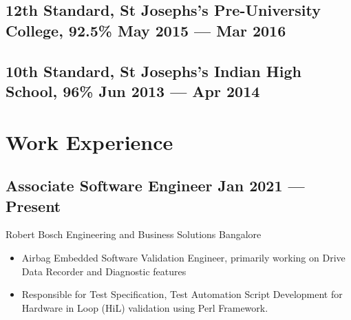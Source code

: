 \documentclass[a4,10pt]{article}
\newcommand{\subtext}[1]{
#1\par\vspace{-0.2cm}}
\newenvironment{zitemize}{
\begin{itemize}\itemsep0pt \parskip0pt \parsep1pt}
{\end{itemize}\vspace{-0.5cm}}
\begin{document}
\subsection*{12th Standard, {\normalsize \normalfont St Josephs's Pre-University College, 92.5\%} \hfill May 2015 --- Mar 2016}
\vspace{0.1cm}
\subsection*{10th Standard, {\normalsize \normalfont St Josephs's Indian High School, 96\%} \hfill Jun 2013 --- Apr 2014} 
\vspace{0.2cm}

\section{Work Experience}

        

\subsection*{Associate Software Engineer \hfill Jan 2021 --- Present} 
\subtext{Robert Bosch Engineering and Business Solutions \hfill Bangalore} 
    \begin{zitemize}
        \item Airbag Embedded Software Validation Engineer, primarily working on Drive Data Recorder and Diagnostic features 
        \item Responsible for Test Specification, Test Automation Script Development for Hardware in Loop (HiL) validation using Perl Framework.
    \end{zitemize}
\end{document}
